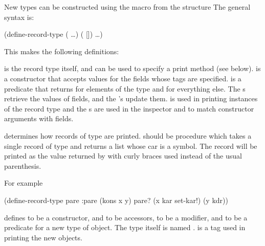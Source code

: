 New types can be constructed using the  macro
 from the  structure
The general syntax is:
\begin{example}
(define-record-type  
  (  \ldots)
  (  [])
  \ldots)
\end{example}
This makes the following definitions:
\begin{protos}
\end{protos}
\noindent
{} is the record type itself, and can be used to
 specify a print method (see below).
 is a constructor that accepts values
 for the fields whose tags are specified.
 is a predicate that returns  for
 elements of the type and  for everything else.
The s retrieve the values of fields,
 and the 's update them.
 is used in printing instances of the record type and
 the s are used in the inspector and to match
 constructor arguments with fields.

\begin{protos}
\end{protos}
\noindent
{} determines how
 records of type  are printed.
 should be procedure which takes a single
 record of type  and returns a list whose car is
 a symbol.
The record will be printed as the value returned by 
 with curly braces used instead of the usual parenthesis.

For example
\begin{example}
(define-record-type pare :pare
  (kons x y)
  pare?
  (x kar set-kar!)
  (y kdr))
\end{example}
 defines  to be a constructor,  and  to be
 accessors,  to be a modifier, and  to be a predicate
 for a new type of object.
The type itself is named .
 is a tag used in printing the new objects.

